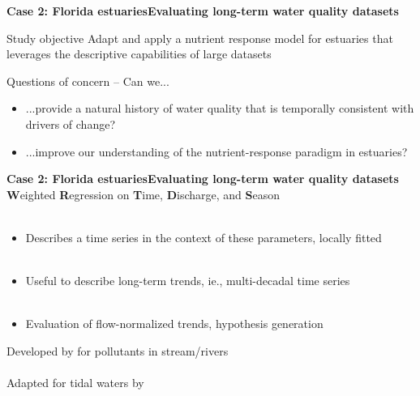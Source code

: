 \documentclass[serif]{beamer}\usepackage[]{graphicx}\usepackage[]{color}
\begin{document}
\begin{frame}{\textbf{Case 2: Florida estuaries}}{\textbf{Evaluating long-term water quality datasets}}
\onslide<+->
\begin{block}{Study objective}
Adapt and apply a nutrient response model for estuaries that leverages the descriptive capabilities of large datasets \scriptsize \cite{Beck15}
\end{block}
\vspace{0.2in}
\onslide<+->
Questions of concern -- Can we...
\begin{itemize}
\item ...provide a natural history of water quality that is temporally consistent with drivers of change?
\onslide<+->
\item ...improve our understanding of the nutrient-response paradigm in estuaries?
\end{itemize}
\end{frame}

\begin{frame}{\textbf{Case 2: Florida estuaries}}{\textbf{Evaluating long-term water quality datasets}}
\onslide<+->
\textbf{W}eighted \textbf{R}egression on \textbf{T}ime, \textbf{D}ischarge, and \textbf{S}eason \\~\\
\begin{itemize}
\item Describes a time series in the context of these parameters, locally fitted \\~\\
\item Useful to describe long-term trends, ie., multi-decadal time series \\~\\
\item Evaluation of flow-normalized trends, hypothesis generation
\end{itemize}
\onslide<+->
\vspace{0.1in}
Developed by \cite{Hirsch10} for pollutants in stream/rivers\\~\\
Adapted for tidal waters by \cite{Beck15}
\end{frame}
\end{document}
